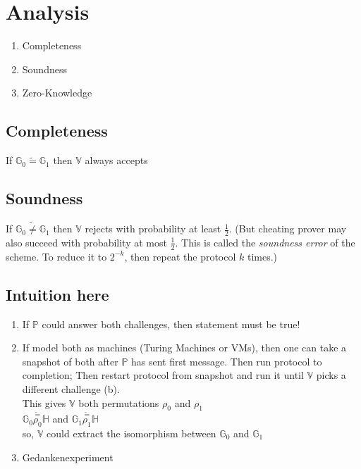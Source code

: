 \documentclass{report}
\begin{document}
 
	\section{Analysis}
	\startsection
		\begin{enumerate}
			\item Completeness
			\item Soundness
			\item Zero-Knowledge
		\end{enumerate}
		\subsection{Completeness}
		\startsubsection
			If $\mathbb{G}_0 \tilde{=} \mathbb{G}_1$ then $\mathbb{V}$ always accepts
		\closesection
		\subsection{Soundness}
		\startsubsection
			If $\mathbb{G}_0 \tilde{\neq} \mathbb{G}_1$ then $\mathbb{V}$ rejects with probability at least $\frac{1}{2}$. (But cheating prover may also succeed with probability at most $\frac{1}{2}$. This is called the \textit{soundness error} of the scheme. To reduce it to $2^{-k}$, then repeat the protocol $k$ times.)
		\closesection
		\subsection{Intuition here}
		\startsubsection
			\begin{enumerate}[-]
				\item If $\mathbb{P}$ could answer both challenges, then statement must be true!
				\item If model both as machines (Turing Machines or VMs), then one can take a snapshot of both after $\mathbb{P}$ has sent first message. Then run protocol to completion; Then restart protocol from snapshot and run it until $\mathbb{V}$ picks a different challenge (b). \\
				This gives $\mathbb{V}$ both permutations $\rho _0$ and $\rho _1$ \\
				$\mathbb{G}_0 \stackrel{\tilde{=}}{\rho _0} \mathbb{H}$ and $\mathbb{G}_1 \stackrel{\tilde{=}}{\rho _1} \mathbb{H}$ \\
				so, $\mathbb{V}$ could extract the isomorphism between $\mathbb{G}_0$ and $\mathbb{G}_1$
				\item Gedankenexperiment
			\end{enumerate}
		\closesection
\end{document}
